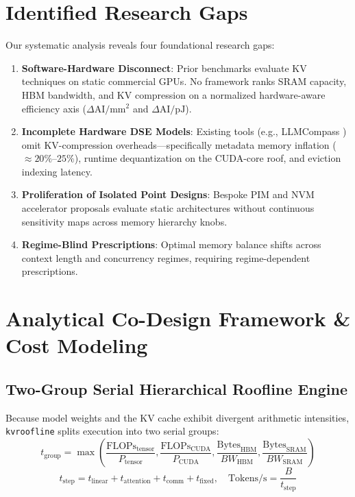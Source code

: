 \documentclass[conference,onecolumn]{IEEEtran}
\begin{document}
\section{Identified Research Gaps}
Our systematic analysis reveals four foundational research gaps:
\begin{enumerate}
    \item \textbf{Software-Hardware Disconnect}: Prior benchmarks \cite{singh2026kvwall} evaluate KV techniques on static commercial GPUs. No framework ranks SRAM capacity, HBM bandwidth, and KV compression on a normalized hardware-aware efficiency axis ($\Delta\text{AI}/\text{mm}^2$ and $\Delta\text{AI}/\text{pJ}$).
    \item \textbf{Incomplete Hardware DSE Models}: Existing tools (e.g., LLMCompass \cite{zhang2024llmcompass}) omit KV-compression overheads---specifically metadata memory inflation ($\approx 20\%$--$25\%$), runtime dequantization on the CUDA-core roof, and eviction indexing latency.
    \item \textbf{Proliferation of Isolated Point Designs}: Bespoke PIM and NVM accelerator proposals evaluate static architectures without continuous sensitivity maps across memory hierarchy knobs.
    \item \textbf{Regime-Blind Prescriptions}: Optimal memory balance shifts across context length and concurrency regimes, requiring regime-dependent prescriptions.
\end{enumerate}

\section{Analytical Co-Design Framework \& Cost Modeling}

\subsection{Two-Group Serial Hierarchical Roofline Engine}
Because model weights and the KV cache exhibit divergent arithmetic intensities, \texttt{kvroofline} splits execution into two serial groups:
\begin{equation}
t_{\text{group}} = \max\left( \frac{\text{FLOPs}_{\text{tensor}}}{P_{\text{tensor}}}, \frac{\text{FLOPs}_{\text{CUDA}}}{P_{\text{CUDA}}}, \frac{\text{Bytes}_{\text{HBM}}}{BW_{\text{HBM}}}, \frac{\text{Bytes}_{\text{SRAM}}}{BW_{\text{SRAM}}} \right)
\end{equation}
\begin{equation}
t_{\text{step}} = t_{\text{linear}} + t_{\text{attention}} + t_{\text{comm}} + t_{\text{fixed}}, \quad \text{Tokens/s} = \frac{B}{t_{\text{step}}}
\end{equation}
\end{document}
